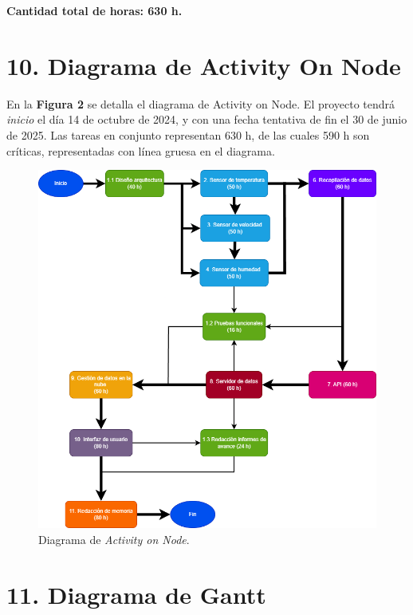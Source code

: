 \documentclass[
11pt, %
codirector, %
]{charter}
\begin{document}
\textbf{Cantidad total de horas: 630 h.}

\newpage

\section{10. Diagrama de Activity On Node}
\label{sec:AoN}

En la \textbf{Figura 2} se detalla el diagrama de Activity on Node. El proyecto tendrá \textit{inicio} el día 14 de octubre de 2024, y con una fecha tentativa de fin el 30 de junio de 2025. Las tareas en conjunto representan 630 h, de las cuales 590 h son críticas, representadas con línea gruesa en el diagrama.

\begin{figure}[htpb]
\centering 
\includegraphics[width=.8\textwidth]{./Figuras/AoN_project.png}
\caption{Diagrama de \textit{Activity on Node}.}
\label{fig:AoN}
\end{figure}

\newpage

\section{11. Diagrama de Gantt}
\label{sec:gantt}
\end{document}
